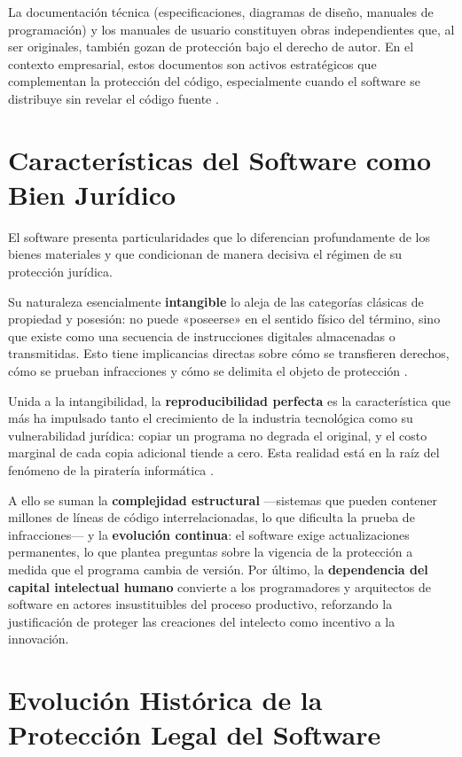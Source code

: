 \documentclass[11pt,a4paper]{report}
\begin{document}
La documentación técnica (especificaciones, diagramas de diseño, manuales de programación) y los manuales de usuario constituyen obras independientes que, al ser originales, también gozan de protección bajo el derecho de autor. En el contexto empresarial, estos documentos son activos estratégicos que complementan la protección del código, especialmente cuando el software se distribuye sin revelar el código fuente \citep{euipo2022}.

\section{Características del Software como Bien Jurídico}

El software presenta particularidades que lo diferencian profundamente de los bienes materiales y que condicionan de manera decisiva el régimen de su protección jurídica.

Su naturaleza esencialmente \textbf{intangible} lo aleja de las categorías clásicas de propiedad y posesión: no puede «poseerse» en el sentido físico del término, sino que existe como una secuencia de instrucciones digitales almacenadas o transmitidas. Esto tiene implicancias directas sobre cómo se transfieren derechos, cómo se prueban infracciones y cómo se delimita el objeto de protección \citep{ompi2024}.

Unida a la intangibilidad, la \textbf{reproducibilidad perfecta} es la característica que más ha impulsado tanto el crecimiento de la industria tecnológica como su vulnerabilidad jurídica: copiar un programa no degrada el original, y el costo marginal de cada copia adicional tiende a cero. Esta realidad está en la raíz del fenómeno de la piratería informática \citep{euipo2022}.

A ello se suman la \textbf{complejidad estructural} —sistemas que pueden contener millones de líneas de código interrelacionadas, lo que dificulta la prueba de infracciones— y la \textbf{evolución continua}: el software exige actualizaciones permanentes, lo que plantea preguntas sobre la vigencia de la protección a medida que el programa cambia de versión. Por último, la \textbf{dependencia del capital intelectual humano} convierte a los programadores y arquitectos de software en actores insustituibles del proceso productivo, reforzando la justificación de proteger las creaciones del intelecto como incentivo a la innovación.

\section{Evolución Histórica de la Protección Legal del Software}
\end{document}
